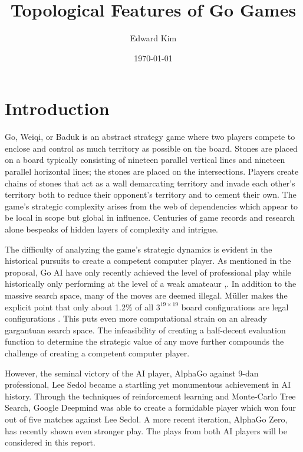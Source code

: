 \documentclass[11pt]{article}
\title{\vspace{-7ex}Topological Features of Go Games \vspace{-2ex}}
\author{Edward Kim}
\date{\vspace{-2ex}\today}
\begin{document}
\maketitle

\section{Introduction}
Go, Weiqi, or Baduk is an abstract strategy game where two players compete to enclose and control as much territory as possible on the board. Stones are placed on a board typically consisting of nineteen parallel vertical lines and  nineteen parallel horizontal lines; the stones are placed on the intersections. Players create chains of stones that act as a wall demarcating territory and invade each other's territory both to reduce their opponent's territory and to cement their own. The game's strategic complexity arises from the web of dependencies which appear to be local in scope but global in influence. Centuries of game records and research alone bespeaks of hidden layers of complexity and intrigue.

The difficulty of analyzing the game's strategic dynamics is evident in the historical pursuits to create a competent computer player. As mentioned in the proposal, Go AI have only recently achieved the level of professional play while historically only performing at the level of a weak amateaur \cite{bays},\cite{muller}. In addition to the massive search space, many of the moves are deemed illegal. M{\" u}ller  makes the explicit point that only about 1.2\% of all $3^{19 \times 19}$ board configurations are legal configurations \cite{muller}. This puts even more computational strain on an already gargantuan search space. The infeasibility of creating a half-decent evaluation function to determine the strategic value of any move further compounds the challenge of creating a competent computer player.

However, the seminal victory of the AI player, AlphaGo against 9-dan professional, Lee Sedol became a startling yet monumentous achievement in AI history. Through the techniques of reinforcement learning and Monte-Carlo Tree Search, Google Deepmind was able to create a formidable player which won four out of five matches against Lee Sedol. \cite{alpha} A more recent iteration, AlphaGo Zero, has recently shown even stronger play. The plays from both AI players will be considered in this report.
\end{document}
